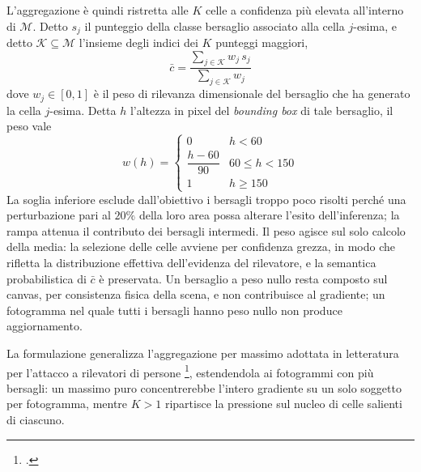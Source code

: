 \documentclass[a4paper,12pt]{report}
\begin{document}
L'aggregazione è quindi ristretta alle $K$ celle a confidenza più elevata
all'interno di $\mathcal{M}$. Detto $s_j$ il punteggio della classe bersaglio
associato alla cella $j$-esima, e detto $\mathcal{K} \subseteq \mathcal{M}$
l'insieme degli indici dei $K$ punteggi maggiori,
\begin{equation}
    \bar{c} = \frac{\sum_{j \in \mathcal{K}} w_j \, s_j}{\sum_{j \in \mathcal{K}} w_j}
    \label{eq:topk}
\end{equation}
dove $w_j \in [0,1]$ è il peso di rilevanza dimensionale del bersaglio che ha
generato la cella $j$-esima. Detta $h$ l'altezza in pixel del \textit{bounding
box} di tale bersaglio, il peso vale
\begin{equation}
    w(h) =
    \begin{cases}
        0 & h < 60 \\[2pt]
        \dfrac{h - 60}{90} & 60 \leq h < 150 \\[6pt]
        1 & h \geq 150
    \end{cases}
    \label{eq:peso_tattico}
\end{equation}
La soglia inferiore esclude dall'obiettivo i bersagli troppo poco risolti perché
una perturbazione pari al $20\%$ della loro area possa alterare l'esito
dell'inferenza; la rampa attenua il contributo dei bersagli intermedi. Il peso
agisce sul solo calcolo della media: la selezione delle celle avviene per
confidenza grezza, in modo che rifletta la distribuzione effettiva dell'evidenza
del rilevatore, e la semantica probabilistica di $\bar{c}$ è preservata. Un
bersaglio a peso nullo resta composto sul canvas, per consistenza fisica della
scena, e non contribuisce al gradiente; un fotogramma nel quale tutti i bersagli
hanno peso nullo non produce aggiornamento.

La formulazione generalizza l'aggregazione per massimo adottata in letteratura
per l'attacco a rilevatori di persone \footcite{thys_2019}, estendendola ai
fotogrammi con più bersagli: un massimo puro concentrerebbe l'intero gradiente
su un solo soggetto per fotogramma, mentre $K > 1$ ripartisce la pressione sul
nucleo di celle salienti di ciascuno.
\end{document}
